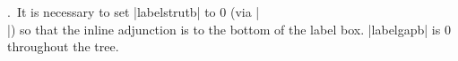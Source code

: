 .\ It is necessary to set |labelstrutb| to 0 (via |\\|) so that
the inline adjunction is to the bottom of the label box.
|labelgapb| is 0 throughout the tree.

\endinput

\jtree[xunit=2em,yunit=1.4em,labelgapb=0,triratio=0]
\deftriangle<tri>(1.8)(1)(-.5)
\defbranch<colonB>(1)(-.5)
\def\gap{\hskip1ex}%
\def\\{[labelstrutb=0]}%
\! = {CP}
   :{\sc WH}\\({\pnode{A1}\gap\pnode{A2}}) {C$'$}
   <tri>{\rlap{V}}@A ^<tri>[triratio=.55]{CP}
   :{\it t}\\({\pnode{B1}\gap\pnode{B2}}) {C$'$}
   <tri>{\rlap{V}}@B ^<tri>[triratio=.55]{CP}
   :{\it t}\\({\pnode{C1}\gap\pnode{C2}}) {C$'$}
   <tri>{\rlap{V}}@C .
\psset{linewidth=1pt,ncurvB=1.1,nodesepA=1ex,
   angleA=-90,angleB=180}
\nccurve{A1}{A}
\nccurve{B1}{B}
\nccurve{C1}{C}
\psset{arrows=->}
\nccurve{A2}{A}
\nccurve{B2}{B}
\nccurve{C2}{C}
\endjtree



